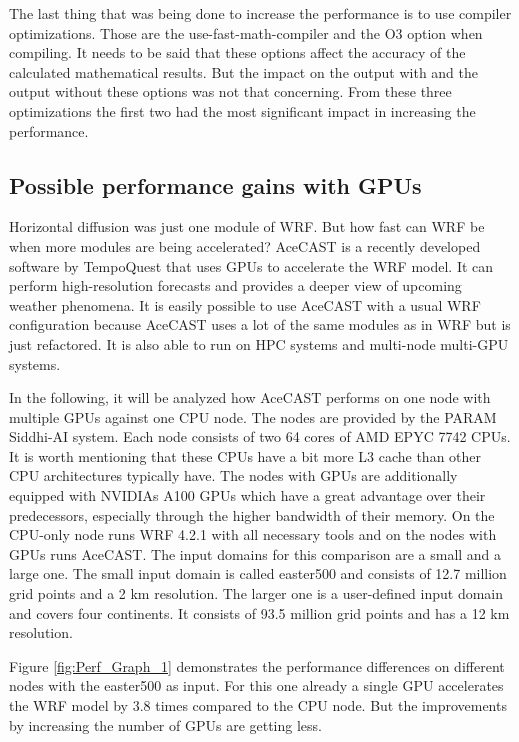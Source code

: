 \documentclass[conference]{IEEEtran}
\begin{document}
The last thing that was being done to increase the performance is to use compiler optimizations. Those are the use-fast-math-compiler and the O3 option when compiling. It needs to be said that these options affect the accuracy of the calculated mathematical results. But the impact on the output with and the output without these options was not that concerning.
From these three optimizations the first two had the most significant impact in increasing the performance.\cite{b14}


\vspace{\baselineskip}
\subsection{Possible performance gains with GPUs}
Horizontal diffusion was just one module of WRF. But how fast can WRF be when more modules are being accelerated? AceCAST is a recently developed software by TempoQuest that uses GPUs to accelerate the WRF model. It can perform high-resolution forecasts and provides a deeper view of upcoming weather phenomena. It is easily possible to use AceCAST with a usual WRF configuration because AceCAST uses a lot of the same modules as in WRF but is just refactored. It is also able to run on HPC systems and multi-node multi-GPU systems.

In the following, it will be analyzed how AceCAST performs on one node with multiple GPUs against one CPU node. The nodes are provided by the PARAM Siddhi-AI system. Each node consists of two 64 cores of AMD EPYC 7742 CPUs. It is worth mentioning that these CPUs have a bit more L3 cache than other CPU architectures typically have. The nodes with GPUs are additionally equipped with NVIDIAs A100 GPUs which have a great advantage over their predecessors, especially through the higher bandwidth of their memory. On the CPU-only node runs WRF 4.2.1 with all necessary tools and on the nodes with GPUs runs AceCAST. The input domains for this comparison are a small and a large one. The small input domain is called easter500 and consists of 12.7 million grid points and a 2 km resolution. The larger one is a user-defined input domain and covers four continents. It consists of 93.5 million grid points and has a 12 km resolution.

Figure \ref{fig:Perf_Graph_1} demonstrates the performance differences on different nodes with the easter500 as input. For this one already a single GPU accelerates the WRF model by 3.8 times compared to the CPU node. But the improvements by increasing the number of GPUs are getting less.
\end{document}
